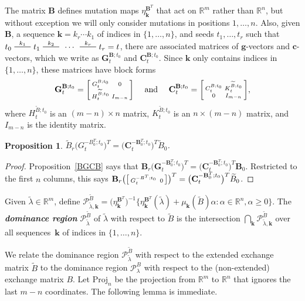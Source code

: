 \documentclass[10pt]{article}
\newtheorem{proposition}{Proposition}[section]
\theoremstyle{definition}
\theoremstyle{remark}
\numberwithin{equation}{section}
\newcommand{\newword}[1]{\textbf{\emph{#1}}}
\newcommand{\reals}{\mathbb R}
\newcommand{\edge}{\,\,\rule[2.7pt]{20pt}{0.5pt}\,\,}
\newcommand{\set}[1]{{\lbrace #1 \rbrace}}
\newcommand{\sett}[1]{{\bigl\lbrace #1 \bigr\rbrace}}
\newcommand{\GG}{{\mathbf G}}
\newcommand{\CC}{{\mathbf C}}
\newcommand{\0}{{\mathbf{0}}}
\newcommand{\Proj}{\mathrm{Proj}}
\newcommand{\g}{\mathbf{g}}
\renewcommand{\c}{\mathbf{c}}
\newcommand{\kk}{{\boldsymbol{k}}}
\newcommand{\tB}{{\widetilde{B}}}
\newcommand{\BB}{\mathbf{B}}
\renewcommand{\H}{\mathcal{H}}
\renewcommand{\P}{\mathcal{P}}
\renewcommand{\c}{{\mathbf c}}
\begin{document}
The matrix $\BB$ defines mutation maps $\eta_\kk^{\BB^T}$ that act on $\reals^m$ rather than $\reals^n$, but without exception we will only consider mutations in positions $1,\ldots,n$.
Also, given $\BB$, a sequence $\kk=k_r\cdots k_1$ of indices in $\set{1,\ldots,n}$, and seeds $t_1,\ldots,t_r$ such that $t_0\overset{k_1}{\edge}t_1\overset{k_2}{\edge}\,\cdots\,\overset{k_r}{\edge}t_r=t$, there are associated matrices of $\g$-vectors and $\c$-vectors, which we write as $\GG_t^{\BB;t_0}$ and $\CC_t^{\BB;t_0}$.
Since $\kk$ only contains indices in $\set{1,\ldots,n}$, these matrices have block forms
\[
\GG_t^{\BB;t_0}=\begin{bsmallmatrix}G_t^{B;t_0}&0\\H_t^{\tB;t_0}&I_{m-n}\end{bsmallmatrix}
\quad\text{ and }\quad
\CC_t^{\BB;t_0}=\begin{bsmallmatrix}C_t^{B;t_0}&K_t^{\tB;t_0}\\0&I_{m-n}\end{bsmallmatrix},
\]
where $H_t^{\tB;t_0}$ is an $(m-n)\times n$ matrix, $K_t^{\tB;t_0}$ is an $n\times(m-n)$ matrix, and $I_{m-n}$ is the identity matrix.

\begin{proposition}\label{BGCB ext}
$\tB_r\bigl(G_t^{-B_0^T;t_0}\bigr)^T=\bigl(\CC_t^{-\BB_0^T;t_0}\bigr)^T\tB_0$.
\end{proposition}
\begin{proof}
Proposition~\ref{BGCB} says that $\BB_r\bigl(\GG_t^{-\BB_0^T;t_0}\bigr)^T=\bigl(\CC_t^{-\BB_0^T;t_0}\bigr)^T\BB_0$.
Restricted to the first $n$ columns, this says $\BB_r\bigl(\begin{bsmallmatrix}G_t^{-B^T;t_0}&\,0\end{bsmallmatrix}\bigr)^T=\bigl(\CC_t^{-\BB_0^T;t_0}\bigr)^T\tB_0$.
\end{proof}

Given $\tilde\lambda\in\reals^m$, define $\P^\tB_{\tilde\lambda,\kk}=\bigl(\eta_{\kk}^{\BB^T}\bigr)^{-1}\sett{\eta_\kk^{\BB^T}(\tilde\lambda)+\mu_\kk(\tB)\alpha:\alpha\in\reals^n,\alpha\ge0}$.
The \newword{dominance region} $\P^\tB_{\tilde\lambda}$ of $\tilde\lambda$ with respect to $\tB$ is the intersection $\bigcap_\kk\P^\tB_{\tilde\lambda,\kk}$ over all sequences~$\kk$ of indices in $\set{1,\ldots,n}$.

We relate the dominance region $\P_{\tilde\lambda}^\tB$ with respect to the extended exchange matrix $\tB$ to the dominance region $\P_\lambda^B$ with respect to the (non-extended) exchange matrix $B$.
Let $\Proj_n$ be the projection from $\reals^m$ to $\reals^n$ that ignores the last $m-n$ coordinates.
The following lemma is immediate.
\end{document}
